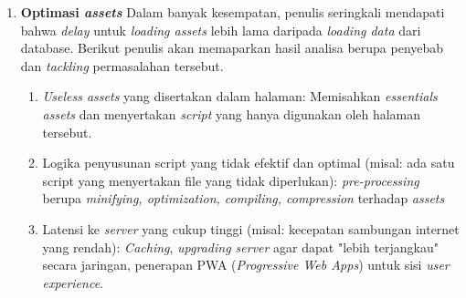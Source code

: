 \begin{enumerate}
		\item \textbf{Optimasi \textit{assets}} \newline
		\indent Dalam banyak kesempatan, penulis seringkali mendapati bahwa \textit{delay} untuk \textit{loading assets} lebih lama daripada \textit{loading data} dari database. Berikut penulis akan memaparkan hasil analisa berupa penyebab dan \textit{tackling} permasalahan tersebut.
			\begin{enumerate}
				\item \textit{Useless assets} yang disertakan dalam halaman: Memisahkan \textit{essentials assets} dan menyertakan \textit{script} yang hanya digunakan oleh halaman tersebut.
				\item Logika penyusunan script yang tidak efektif dan optimal (misal: ada satu script yang menyertakan file yang tidak diperlukan): \textit{pre-processing} berupa \textit{minifying, optimization, compiling, compression} terhadap \textit{assets}
				\item Latensi ke \textit{server} yang cukup tinggi (misal: kecepatan sambungan internet yang rendah): \textit{Caching}, \textit{upgrading server} agar dapat "lebih terjangkau" secara jaringan, penerapan PWA (\textit{Progressive Web Apps}) untuk sisi \textit{user experience}.
			\end{enumerate}
	\end{enumerate}